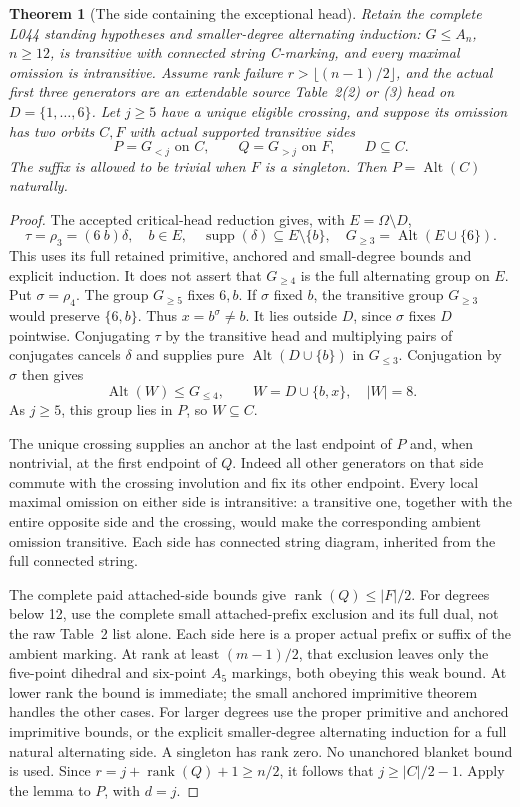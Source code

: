 \documentclass[11pt,a4paper]{article}
\newtheorem{theorem}[lemma]{Theorem}
\newcommand{\Alt}{\operatorname{Alt}}
\begin{document}
\begin{theorem}[The side containing the exceptional head]
Retain the complete L044 standing hypotheses and smaller-degree
alternating induction: $G\le A_n$, $n\ge12$, is transitive with
connected string C-marking, and every maximal omission is
intransitive. Assume rank failure $r>\lfloor(n-1)/2\rfloor$,
and the actual first three generators are an extendable source
Table~2(2) or (3) head on $D=\{1,\ldots,6\}$.
Let $j\ge5$ have a unique eligible crossing, and suppose its
omission has two orbits $C,F$ with actual supported transitive
sides
\[
       P=G_{<j}\text{ on }C,\qquad Q=G_{>j}\text{ on }F,
       \qquad D\subseteq C.
\]
The suffix is allowed to be trivial when $F$ is a singleton.
Then $P=\Alt(C)$ naturally.
\end{theorem}
\begin{proof}
The accepted critical-head reduction gives, with $E=\Omega\setminus D$,
\[
 \tau=\rho_3=(6\ b)\delta,\quad b\in E,\quad
 \operatorname{supp}(\delta)\subseteq E\setminus\{b\},
 \quad G_{\ge3}=\Alt(E\cup\{6\}).
\]
This uses its full retained primitive, anchored and small-degree
bounds and explicit induction. It does not assert that
$G_{\ge4}$ is the full alternating group on $E$.
Put $\sigma=\rho_4$. The group $G_{\ge5}$ fixes $6,b$.
If $\sigma$ fixed $b$, the transitive group $G_{\ge3}$ would
preserve $\{6,b\}$. Thus $x=b^\sigma\ne b$.
It lies outside $D$, since $\sigma$ fixes $D$ pointwise.
Conjugating $\tau$ by the transitive head and multiplying pairs
of conjugates cancels $\delta$ and supplies pure
$\Alt(D\cup\{b\})$ in $G_{\le3}$.
Conjugation by $\sigma$ then gives
\[
                  \Alt(W)\le G_{\le4},\qquad
                  W=D\cup\{b,x\},\quad |W|=8.
\]
As $j\ge5$, this group lies in $P$, so $W\subseteq C$.

The unique crossing supplies an anchor at the last endpoint of
$P$ and, when nontrivial, at the first endpoint of $Q$.
Indeed all other generators on that side commute with the
crossing involution and fix its other endpoint. Every local
maximal omission on either side is intransitive: a transitive
one, together with the entire opposite side and the crossing,
would make the corresponding ambient omission transitive.
Each side has connected string diagram, inherited from the
full connected string.

The complete paid attached-side bounds give
$\operatorname{rank}(Q)\le |F|/2$.
For degrees below 12, use the complete small attached-prefix
exclusion and its full dual, not the raw Table~2 list alone.
Each side here is a proper actual prefix or suffix of the ambient
marking. At rank at least $(m-1)/2$, that exclusion leaves only
the five-point dihedral and six-point $A_5$ markings, both
obeying this weak bound. At lower rank the bound is immediate;
the small anchored imprimitive theorem handles the other cases.
For larger degrees use the proper primitive and anchored
imprimitive bounds, or the explicit smaller-degree alternating
induction for a full natural alternating side. A singleton has
rank zero. No unanchored blanket bound is used.
Since $r=j+\operatorname{rank}(Q)+1\ge n/2$, it follows that
$j\ge |C|/2-1$. Apply the lemma to $P$, with $d=j$.
\end{proof}
\end{document}
